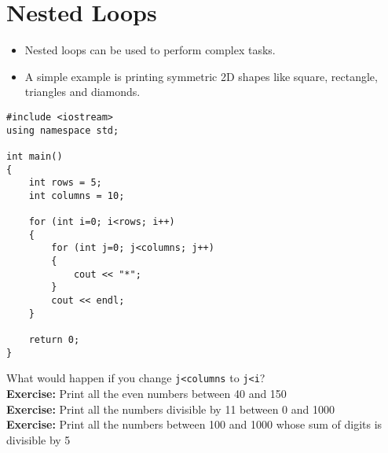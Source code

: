 \documentclass[12pt,a4paper]{article}
\begin{document}
\section{Nested Loops}
\begin{itemize}
\item Nested loops can be used to perform complex tasks.
\item A simple example is printing symmetric 2D shapes like square, rectangle, triangles and diamonds.
\end{itemize}
\begin{lstlisting}[caption={Using for Loop to Make Rectangle and Square}]
#include <iostream>
using namespace std;

int main()
{
	int rows = 5;
	int columns = 10;
	
	for (int i=0; i<rows; i++)
	{
		for (int j=0; j<columns; j++)
		{
			cout << "*";
		}
		cout << endl;			
	}
	
	return 0;
}
\end{lstlisting}
What would happen if you change \verb|j<columns| to \verb|j<i|?\\
\noindent \textbf{Exercise:} Print all the even numbers between 40 and 150\\
\noindent \textbf{Exercise:} Print all the numbers divisible by 11 between 0 and 1000\\
\noindent \textbf{Exercise:} Print all the numbers between 100 and 1000 whose sum of digits is divisible by 5\\
\end{document}
